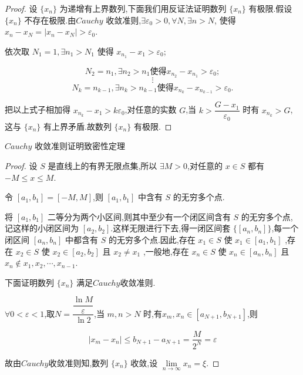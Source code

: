 \begin{proof}
	设 $\{x_n\}$ 为递增有上界数列,下面我们用反证法证明数列 $\{x_n\}$ 有极限.假设 $\{x_n\}$ 不存在极限.由$Cauchy$ 收敛准则,$\exists \varepsilon_0 > 0, \forall N, \exists n > N$, 使得 $x_n - x_N = |x_n - x_N| > \varepsilon_0$.

依次取 $N_1 = 1, \exists n_1 > N_1$ 使得 $x_{n_1} - x_1 > \varepsilon_0$;

$$N_2 = n_1, \exists n_2 > n_1 \text{使得} x_{n_2} - x_{n_1} > \varepsilon_0; $$ $$\vdots $$ $$N_k = n_{k-1}, \exists n_k > n_{k-1} \text{使得} x_{n_k} - x_{n_{k-1}} > \varepsilon_0. $$

把以上式子相加得 $x_{n_k} - x_1 > k \varepsilon_0$,对任意的实数 $G$,当 $k > \dfrac{G - x_1}{\varepsilon_0}$ 时有 $x_{n_k} > G$,这与 $\{x_n\}$ 有上界矛盾.故数列 $\{x_n\}$ 有极限.

\end{proof}
\begin{proposition}
	$Cauchy$ 收敛准则证明致密性定理

\end{proposition}
\begin{proof}
	设 $S$ 是直线上的有界无限点集,所以 $\exists M > 0$,对任意的 $x \in S$ 都有 $-M \leqslant x \leqslant M$.

令 $[a_1, b_1] = [-M, M]$,则 $[a_1, b_1]$ 中含有 $S$ 的无穷多个点.

将 $[a_1, b_1]$ 二等分为两个小区间,则其中至少有一个闭区间含有 $S$ 的无穷多个点,记这样的小闭区间为 $[a_2, b_2]$.这样无限进行下去,得一闭区间套 $\{[a_n, b_n]\}$,每一个闭区间 $[a_n, b_n]$ 中都含有 $S$ 的无穷多个点.因此,存在 $x_1 \in S$ 使 $x_1 \in [a_1, b_1]$ ,存在 $x_2 \in S$ 使 $x_2 \in [a_2, b_2]$ 且 $x_2 \neq x_1$ ,一般地,存在 $x_n \in S$ 使 $x_n \in [a_n, b_n]$ 且 $x_n \notin {x_1, x_2, \cdots, x_{n-1}}$.

下面证明数列 $\{x_n\}$ 满足$Cauchy$收敛准则.

$\forall 0 < \varepsilon < 1$,取$N = \dfrac{\dfrac{\ln M}{\varepsilon}}{\ln 2}$,当 $m, n > N$ 时,有$x_m, x_n \in [a_{N+1}, b_{N+1}]$,则

$$|x_m - x_n| \leqslant b_{N+1} - a_{N+1} = \dfrac{M}{2^N} = \varepsilon  $$

故由$Cauchy$收敛准则知,数列 $\{x_n\}$ 收敛,设 $\lim\limits_{n \to \infty} x_n = \xi$.

\end{proof}











